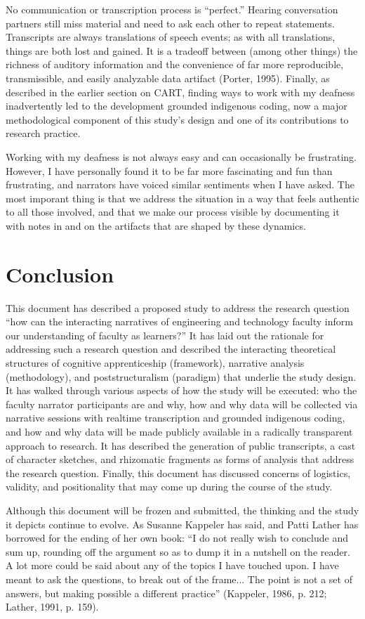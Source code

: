 No communication or transcription process is “perfect.” Hearing conversation partners still miss material and need to ask each other to repeat statements. Transcripts are always translations of speech events; as with all translations, things are both lost and gained. It is a tradeoff between (among other things) the richness of auditory information and the convenience of far more reproducible, transmissible, and easily analyzable data artifact (Porter, 1995). Finally, as described in the earlier section on CART, finding ways to work with my deafness inadvertently led to the development grounded indigenous coding, now a major methodological component of this study’s design and one of its contributions to research practice.

Working with my deafness is not always easy and can occasionally be frustrating. However, I have personally found it to be far more fascinating and fun than frustrating, and narrators have voiced similar sentiments when I have asked. The most imporant thing is that we address the situation in a way that feels authentic to all those involved, and that we make our process visible by documenting it with notes in and on the artifacts that are shaped by these dynamics.

\section{Conclusion}

This document has described a proposed study to address the research question “how can the interacting narratives of engineering and technology faculty inform our understanding of faculty as learners?” It has laid out the rationale for addressing such a research question and described the interacting theoretical structures of cognitive apprenticeship (framework), narrative analysis (methodology), and poststructuralism (paradigm) that underlie the study design. It has walked through various aspects of how the study will be executed: who the faculty narrator participants are and why, how and why data will be collected via narrative sessions with realtime transcription and grounded indigenous coding, and how and why data will be made publicly available in a radically transparent approach to research. It has described the generation of public transcripts, a cast of character sketches, and rhizomatic fragments as forms of analysis that address the research question. Finally, this document has discussed concerns of logistics, validity, and positionality that may come up during the course of the study.

Although this document will be frozen and submitted, the thinking and the study it depicts continue to evolve. As Susanne Kappeler has said, and Patti Lather has borrowed for the ending of her own book: “I do not really wish to conclude and sum up, rounding off the argument so as to dump it in a nutshell on the reader. A lot more could be said about any of the topics I have touched upon. I have meant to ask the questions, to break out of the frame... The point is not a set of answers, but making possible a different practice” (Kappeler, 1986, p. 212; Lather, 1991, p. 159).
